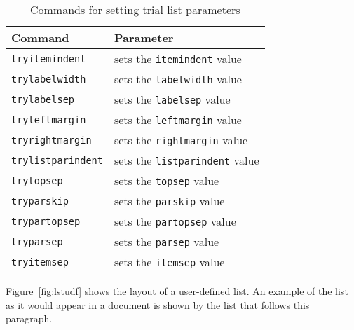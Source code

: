 \documentclass[11pt]{article}
\makeatletter
\newcommand{\pixcom}[1]{\texttt{\bs #1}\index{#1/ @\texttt{\protect\bs #1}}}
\makeatother
\begin{document}
\begin{table}
\centering
\caption{Commands for setting trial list parameters} \label{tab:tlist}
\begin{tabular}{|l|l|} \hline
Command & Parameter \\ \hline
\pixcom{tryitemindent} & sets the \pixcom{itemindent} value \\
\pixcom{trylabelwidth} & sets the \pixcom{labelwidth} value \\
\pixcom{trylabelsep} & sets the \pixcom{labelsep} value \\
\pixcom{tryleftmargin} & sets the \pixcom{leftmargin} value \\
\pixcom{tryrightmargin} & sets the \pixcom{rightmargin} value \\
\pixcom{trylistparindent} & sets the \pixcom{listparindent} value \\
\pixcom{trytopsep} & sets the \pixcom{topsep} value \\
\pixcom{tryparskip} & sets the \pixcom{parskip} value \\
\pixcom{trypartopsep} & sets the \pixcom{partopsep} value \\
\pixcom{tryparsep} & sets the \pixcom{parsep} value \\
\pixcom{tryitemsep} & sets the \pixcom{itemsep} value \\
\hline
\end{tabular}
\end{table}

\newenvironment{listX}%
  {\begin{list}{item}%
    {\setlength{\itemindent}{-30pt}%
     \setlength{\labelwidth}{80pt}%
     \setlength{\labelsep}{1em}%
     \setlength{\leftmargin}{170pt}%
     \setlength{\rightmargin}{-40pt}%
     \setlength{\listparindent}{80pt}%
     \setlength{\topsep}{3ex}%
     \setlength{\partopsep}{\topsep}%
     \setlength{\parsep}{\topsep}%
     \setlength{\itemsep}{\topsep}%
    }%
  }%
  {\end{list}}

    Figure~\ref{fig:lstudf} shows the layout of a user-defined list.
An example of the list as it would appear in a document is shown by the
list that follows this paragraph.
\end{document}
